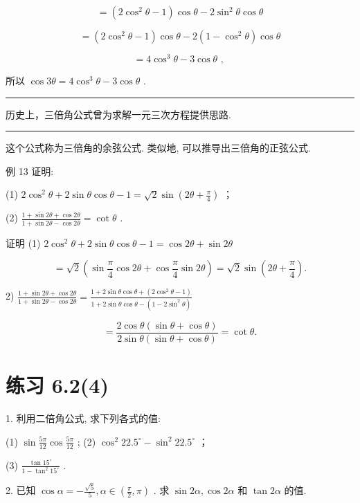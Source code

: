 \documentclass[10pt]{article}
\newcommand{\HRule}{\begin{center}\rule{0.9\linewidth}{0.2mm}\end{center}}
\begin{document}
\[
= \left( {2{\cos }^{2}\theta  - 1}\right) \cos \theta  - 2{\sin }^{2}\theta \cos \theta
\]

\[
= \left( {2{\cos }^{2}\theta  - 1}\right) \cos \theta  - 2\left( {1 - {\cos }^{2}\theta }\right) \cos \theta
\]

\[
= 4{\cos }^{3}\theta  - 3\cos \theta \text{ , }
\]

所以 \(\cos {3\theta } = 4{\cos }^{3}\theta  - 3\cos \theta\) .

\HRule

历史上，三倍角公式曾为求解一元三次方程提供思路.

\HRule

这个公式称为三倍角的余弦公式. 类似地, 可以推导出三倍角的正弦公式.

例 13 证明:

(1) \(2{\cos }^{2}\theta  + 2\sin \theta \cos \theta  - 1 = \sqrt{2}\sin \left( {{2\theta } + \frac{\pi }{4}}\right)\) ；

(2) \(\frac{1 + \sin {2\theta } + \cos {2\theta }}{1 + \sin {2\theta } - \cos {2\theta }} = \cot \theta\) .

证明 (1) \(2{\cos }^{2}\theta  + 2\sin \theta \cos \theta  - 1 = \cos {2\theta } + \sin {2\theta }\)

\[
= \sqrt{2}\left( {\sin \frac{\pi }{4}\cos {2\theta } + \cos \frac{\pi }{4}\sin {2\theta }}\right)  = \sqrt{2}\sin \left( {{2\theta } + \frac{\pi }{4}}\right) .
\]

2) \(\frac{1 + \sin {2\theta } + \cos {2\theta }}{1 + \sin {2\theta } - \cos {2\theta }} = \frac{1 + 2\sin \theta \cos \theta  + \left( {2{\cos }^{2}\theta  - 1}\right) }{1 + 2\sin \theta \cos \theta  - \left( {1 - 2{\sin }^{2}\theta }\right) }\)

\[
= \frac{2\cos \theta \left( {\sin \theta  + \cos \theta }\right) }{2\sin \theta \left( {\sin \theta  + \cos \theta }\right) } = \cot \theta .
\]

\section*{练习 6.2(4)}

1. 利用二倍角公式, 求下列各式的值:

(1) \(\sin \frac{5\pi }{12}\cos \frac{5\pi }{12}\) ; (2) \({\cos }^{2}{22.5}^{ \circ  } - {\sin }^{2}{22.5}^{ \circ  }\) ；

(3) \(\frac{\tan {15}^{ \circ  }}{1 - {\tan }^{2}{15}^{ \circ  }}\) .

2. 已知 \(\cos \alpha  =  - \frac{\sqrt{5}}{5},\alpha  \in  \left( {\frac{\pi }{2},\pi }\right)\) . 求 \(\sin {2\alpha },\cos {2\alpha }\) 和 \(\tan {2\alpha }\) 的值.
\end{document}

